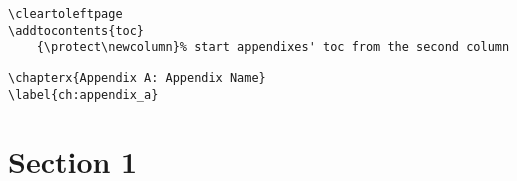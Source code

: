 \documentclass[itdr]{subfiles}
\begin{document}
\cleartoleftpage
{}%

\label{ch:appendix_a}

\begin{lstlisting}
\cleartoleftpage
\addtocontents{toc}
	{\protect\newcolumn}% start appendixes' toc from the second column
\end{lstlisting}

\begin{lstlisting}
\chapterx{Appendix A: Appendix Name}
\label{ch:appendix_a}
\end{lstlisting}

\section{Section 1}

\lipsum[1]
\end{document}
